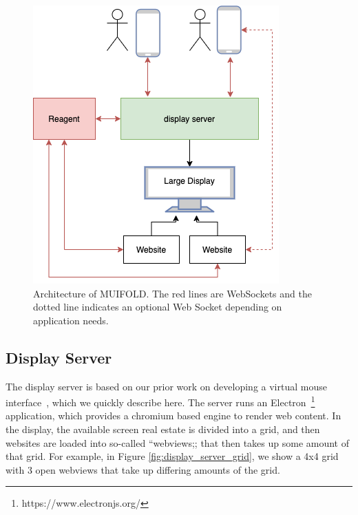 \begin{figure}
\centering
  \includegraphics[width=0.8\columnwidth]{figures/muifold_architecture}
  \caption{Architecture of MUIFOLD. The red lines are WebSockets and the dotted line indicates an optional Web Socket depending on application needs.}
  \label{fig:architecture_muifold}
\end{figure}

\subsection{Display Server}

The display
server is based on our prior work on developing a virtual mouse
interface~\cite{peveler_virtual_2020}, which we quickly describe
here. The server runs an
Electron~\footnote{https://www.electronjs.org/} application, which
provides a chromium based engine to render web content. In the
display, the available screen real estate is divided into a grid,
and then websites are loaded into so-called ``webviews;; that then
takes up some amount of that grid. For example, in Figure
\ref{fig:display_server_grid}, we show a 4x4 grid with 3 open
webviews that take up differing amounts of the grid.

